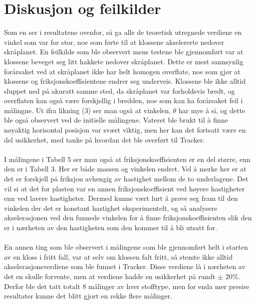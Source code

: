 \documentclass[10pt,a4paper]{report}
\begin{document}
\section*{Diskusjon og feilkilder}
Som en ser i resultatene ovenfor, så ga alle de teoretisk utregnede verdiene en vinkel som var for stor, noe som førte til at klossene akselererte nedover skråplanet. En feilkilde som ble observert mens testene ble gjennomført var at klossene beveget seg litt hakkete nedover skråplanet. Dette er mest sannsynlig forårsaket ved at skråplanet ikke har helt homogen overflate, noe som gjør at klossene og friksjonskoeffisientene endrer seg underveis. Klossene ble ikke alltid sluppet ned på akuratt samme sted, da skråplanet var forholdsvis bredt, og overflaten kan også være forskjellig i bredden, noe som kan ha forårsaket feil i målingne. Ut ifra likning (3) ser man også at vinkelen, $\theta$ har mye å si, og dette ble også observert ved de initielle målingene. Vateret ble brukt til å finne nøyaktig horisontal posisjon var svært viktig, men her kan det fortsatt være en del usikkerhet, med tanke på hvordan det ble overført til Tracker. \\
\\I målingene i Tabell 5 ser man også at friksjonskoeffisienten er en del større, enn den er i Tabell 3. Her er både massen og vinkelen endret. Vel å merke her er at det er forskjell på friksjon avhengig av hastighet mellom de to underlagene. Det vil si at det for plasten var en annen friksjonskoeffisient ved høyere hastigheter enn ved lavere hastigheter. Dermed kunne vært lurt å prøve seg fram til den vinkelen der det er konstant hastighet eksperimentelt, og så analysere akselerasjonen ved den funnede vinkelen for å finne friksjonskoeffisienten slik den er i nærheten av den hastigheten som den kommer til å bli utsatt for.\\
\\En annen ting som ble observert i målingene som ble gjennomført helt i starten av en kloss i fritt fall, var at selv om klossen falt fritt, så stemte ikke alltid akselerasjonsverdiene som ble funnet i Tracker. Disse verdiene lå i nærheten av det en skulle forvente, men at verdiene hadde en usikkerhet på rundt $\pm$ 20$\%$. Derfor ble det tatt totalt 8 målinger av hver stofftype, men for enda mer presise resultater kunne det blitt gjort en rekke flere målinger.
\end{document}
